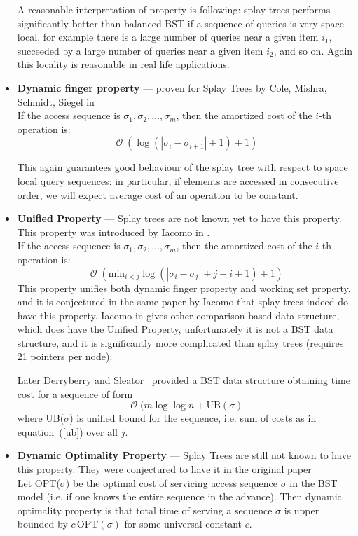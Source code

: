 \documentclass[11pt]{article}
\DeclareMathOperator*{\Oh}{\mathcal{O}}
\begin{document}
\begin{itemize}
		A reasonable interpretation of property is following: splay trees performs significantly better than balanced BST if a sequence of queries is very space local, for example there is a large number of queries near a given item $i_1$, succeeded by a large number of queries near a given item $i_2$, and so on. Again this locality is reasonable in real life applications.
	\item {\bf Dynamic finger property} --- proven for Splay Trees by Cole, Mishra, Schmidt, Siegel in \cite{DBLP:journals/siamcomp/ColeMSS00}\cite{DBLP:journals/siamcomp/Cole00} \\
		If the access sequence is $\sigma_1, \sigma_2, \ldots, \sigma_m$, then the amortized cost of the $i$-th operation is:
		\begin{equation*}
			\Oh(\log(|\sigma_i - \sigma_{i+1}| + 1) + 1)
		\end{equation*}

		This again guarantees good behaviour of the splay tree with respect to space local query sequences: in particular, if elements are accessed in consecutive order, we will expect average cost of an operation to be constant.
	\item {\bf Unified Property} --- Splay trees are not known yet to have this property. This property was introduced by Iacomo in \cite{DBLP:conf/soda/Iacono01a}. \\
		If the access sequence is $\sigma_1, \sigma_2, \ldots, \sigma_m$, then the amortized cost of the $i$-th operation is:
		\begin{equation}
			\Oh(\mathrm{min}_{i < j} \log(|\sigma_i - \sigma_j| + j-i + 1) + 1) \label{ub}
		\end{equation}
		This property unifies both dynamic finger property and working set property, and it is conjectured in the same paper by Iacomo that splay trees indeed do have this property. Iacomo in \cite{DBLP:conf/soda/Iacono01a} gives other comparison based data structure, which does have the Unified Property, unfortunately it is not a BST data structure, and it is significantly more complicated than splay trees (requires 21 pointers per node).

		Later Derryberry and Sleator~\cite{DBLP:conf/wads/DerryberryS09} provided a BST data structure obtaining time cost for a sequence of form
		\begin{equation*}
			\Oh(m\log\log n + \mathrm{UB}(\sigma)
		\end{equation*}
		where UB($\sigma$) is unified bound for the sequence, i.e. sum of costs as in equation~(\ref{ub}) over all $j$.
	\item {\bf Dynamic Optimality Property} --- Splay Trees are still not known to have this property. They were conjectured to have it in the original paper \cite{DBLP:journals/jacm/SleatorT85} \\
		Let OPT($\sigma$) be the optimal cost of servicing access sequence $\sigma$ in the BST model (i.e. if one knows the entire sequence in the advance). Then dynamic optimality property is that total time of serving a sequence $\sigma$ is upper bounded by $c\, \mathrm{OPT}(\sigma)$ for some universal constant $c$.


\end{itemize}
\end{document}

